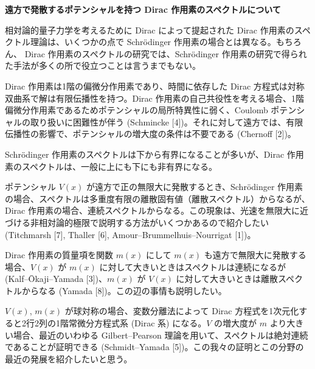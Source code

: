 \documentclass[uplatex,dvipdfmx]{jlreq}
\begin{document}
\newpage

\begin{center}
{\large\bfseries 遠方で発散するポテンシャルを持つ Dirac 作用素のスペクトルについて}\\[6pt]
\hspace*{\fill}{\large\bfseries 山田 修宣 (立命館大・理工)}
\end{center}

相対論的量子力学を考えるために Dirac によって提起された
Dirac 作用素のスペクトル理論は、いくつかの点で Schr\"{o}dinger 作用素の場合とは異なる。もちろん、
Dirac 作用素のスペクトルの研究では、Schr\"{o}dinger 作用素の研究で得られた手法が多くの所で役立つことは言うまでもない。

Dirac 作用素は1階の偏微分作用素であり、時間に依存した Dirac 方程式は対称双曲系で解は有限伝播性を持つ。Dirac 作用素の自己共役性を考える場合、1階偏微分作用素であるためポテンシャルの局所特異性に弱く、Coulomb ポテンシャルの取り扱いに困難性が伴う (Schmincke [4])。それに対して遠方では、有限伝播性の影響で、ポテンシャルの増大度の条件は不要である (Chernoff [2])。

Schr\"{o}dinger 作用素のスペクトルは下から有界になることが多いが、Dirac 作用素のスペクトルは、一般に上にも下にも非有界になる。

ポテンシャル $V(x)$ が遠方で正の無限大に発散するとき、Schr\"{o}dinger 作用素の場合、スペクトルは多重度有限の離散固有値（離散スペクトル）からなるが、Dirac 作用素の場合、連続スペクトルからなる。この現象は、光速を無限大に近づける非相対論的極限で説明する方法がいくつかあるので紹介したい (Titchmarsh [7], Thaller [6], Amour--Brummelhuis--Nourrigat [1])。

Dirac 作用素の質量項を関数 $m(x)$ にして $m(x)$ も遠方で無限大に発散する場合、$V(x)$ が $m(x)$ に対して大きいときはスペクトルは連続になるが
(Kalf--\={O}kaji--Yamada [3])、$m(x)$ が $V(x)$ に対して大きいときは離散スペクトルからなる (Yamada [8])。この辺の事情も説明したい。

$V(x)$, $m(x)$ が球対称の場合、変数分離法によって Dirac 方程式を1次元化すると2行2列の1階常微分方程式系 (Dirac 系) になる。$V$ の増大度が $m$ より大きい場合、最近のいわゆる Gilbert--Pearson 理論を用いて、スペクトルは絶対連続であることが証明できる (Schmidt--Yamada [5])。この我々の証明とこの分野の最近の発展を紹介したいと思う。
\end{document}
